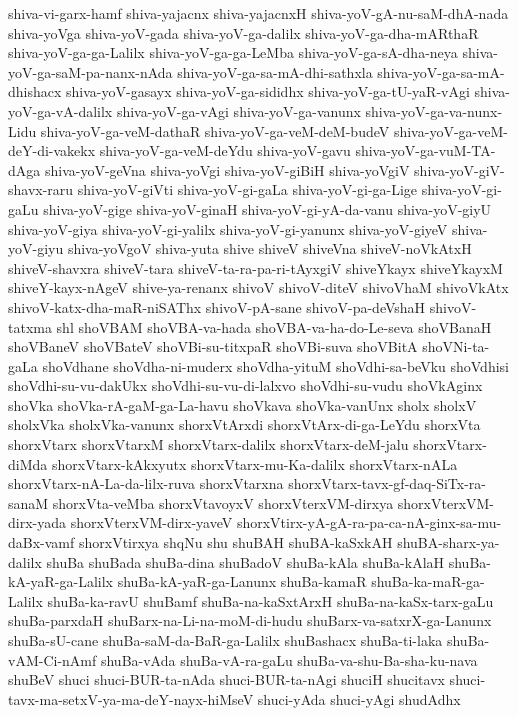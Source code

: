 {shiva-vi-garx-hamf
shiva-yajacnx
shiva-yajacnxH
shiva-yoV-gA-nu-saM-dhA-nada
shiva-yoVga
shiva-yoV-gada
shiva-yoV-ga-dalilx
shiva-yoV-ga-dha-mARthaR
shiva-yoV-ga-ga-Lalilx
shiva-yoV-ga-ga-LeMba
shiva-yoV-ga-sA-dha-neya
shiva-yoV-ga-saM-pa-nanx-nAda
shiva-yoV-ga-sa-mA-dhi-sathxla
shiva-yoV-ga-sa-mA-dhishacx
shiva-yoV-gasayx
shiva-yoV-ga-sididhx
shiva-yoV-ga-tU-yaR-vAgi
shiva-yoV-ga-vA-dalilx
shiva-yoV-ga-vAgi
shiva-yoV-ga-vanunx
shiva-yoV-ga-va-nunx-Lidu
shiva-yoV-ga-veM-dathaR
shiva-yoV-ga-veM-deM-budeV
shiva-yoV-ga-veM-deY-di-vakekx
shiva-yoV-ga-veM-deYdu
shiva-yoV-gavu
shiva-yoV-ga-vuM-TA-dAga
shiva-yoV-geVna
shiva-yoVgi
shiva-yoV-giBiH
shiva-yoVgiV
shiva-yoV-giV-shavx-raru
shiva-yoV-giVti
shiva-yoV-gi-gaLa
shiva-yoV-gi-ga-Lige
shiva-yoV-gi-gaLu
shiva-yoV-gige
shiva-yoV-ginaH
shiva-yoV-gi-yA-da-vanu
shiva-yoV-giyU
shiva-yoV-giya
shiva-yoV-gi-yalilx
shiva-yoV-gi-yanunx
shiva-yoV-giyeV
shiva-yoV-giyu
shiva-yoVgoV
shiva-yuta
shive
shiveV
shiveVna
shiveV-noVkAtxH
shiveV-shavxra
shiveV-tara
shiveV-ta-ra-pa-ri-tAyxgiV
shiveYkayx
shiveYkayxM
shiveY-kayx-nAgeV
shive-ya-renanx
shivoV
shivoV-diteV
shivoVhaM
shivoVkAtx
shivoV-katx-dha-maR-niSAThx
shivoV-pA-sane
shivoV-pa-deVshaH
shivoV-tatxma
shl
shoVBAM
shoVBA-va-hada
shoVBA-va-ha-do-Le-seva
shoVBanaH
shoVBaneV
shoVBateV
shoVBi-su-titxpaR
shoVBi-suva
shoVBitA
shoVNi-ta-gaLa
shoVdhane
shoVdha-ni-muderx
shoVdha-yituM
shoVdhi-sa-beVku
shoVdhisi
shoVdhi-su-vu-dakUkx
shoVdhi-su-vu-di-lalxvo
shoVdhi-su-vudu
shoVkAginx
shoVka
shoVka-rA-gaM-ga-La-havu
shoVkava
shoVka-vanUnx
sholx
sholxV
sholxVka
sholxVka-vanunx
shorxVtArxdi
shorxVtArx-di-ga-LeYdu
shorxVta
shorxVtarx
shorxVtarxM
shorxVtarx-dalilx
shorxVtarx-deM-jalu
shorxVtarx-diMda
shorxVtarx-kAkxyutx
shorxVtarx-mu-Ka-dalilx
shorxVtarx-nALa
shorxVtarx-nA-La-da-lilx-ruva
shorxVtarxna
shorxVtarx-tavx-gf-daq-SiTx-ra-sanaM
shorxVta-veMba
shorxVtavoyxV
shorxVterxVM-dirxya
shorxVterxVM-dirx-yada
shorxVterxVM-dirx-yaveV
shorxVtirx-yA-gA-ra-pa-ca-nA-ginx-sa-mu-daBx-vamf
shorxVtirxya
shqNu
shu
shuBAH
shuBA-kaSxkAH
shuBA-sharx-ya-dalilx
shuBa
shuBada
shuBa-dina
shuBadoV
shuBa-kAla
shuBa-kAlaH
shuBa-kA-yaR-ga-Lalilx
shuBa-kA-yaR-ga-Lanunx
shuBa-kamaR
shuBa-ka-maR-ga-Lalilx
shuBa-ka-ravU
shuBamf
shuBa-na-kaSxtArxH
shuBa-na-kaSx-tarx-gaLu
shuBa-parxdaH
shuBarx-na-Li-na-moM-di-hudu
shuBarx-va-satxrX-ga-Lanunx
shuBa-sU-cane
shuBa-saM-da-BaR-ga-Lalilx
shuBashacx
shuBa-ti-laka
shuBa-vAM-Ci-nAmf
shuBa-vAda
shuBa-vA-ra-gaLu
shuBa-va-shu-Ba-sha-ku-nava
shuBeV
shuci
shuci-BUR-ta-nAda
shuci-BUR-ta-nAgi
shuciH
shucitavx
shuci-tavx-ma-setxV-ya-ma-deY-nayx-hiMseV
shuci-yAda
shuci-yAgi
shudAdhx
}
